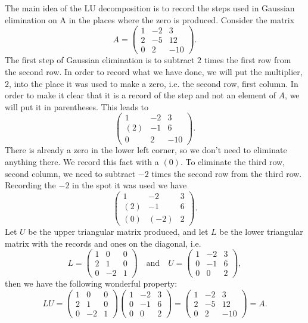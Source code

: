 The main idea of the LU decomposition
is to record the steps used in Gaussian elimination on A
in the places where the zero is produced.
Consider the matrix
$$
 A = \left(\begin{array}{ccc}
        1 & -2 & 3 \\
        2 & -5 & 12  \\
        0 & 2 & -10
      \end{array}\right).
$$
The first step of Gaussian elimination is to subtract $2$ times the
first row from the second row. In order to record what we have done,
we will put the multiplier, $2$, into the place it was used to make a
zero, i.e. the second row, first column. In order to make it clear
that it is a record of the step and not an element of $A$, we will put
it in parentheses. This leads to
$$
\left(\begin{array}{ccc}
        1 & -2 & 3 \\
        (2) & -1 & 6  \\
        0 & 2 & -10
      \end{array}\right).
$$
There is already a zero in the lower left corner, so we don't need to eliminate
anything there. We record this fact with a $(0)$. To eliminate the third row,
second column, we need to subtract
$-2$ times the second row from the third row. Recording the $-2$ in the spot
it was used we have
$$
\left(\begin{array}{ccc}
        1 & -2 & 3 \\
        (2) & -1 & 6  \\
        (0) & (-2) & 2
      \end{array}\right).
$$
Let $U$ be the upper triangular matrix produced, and let $L$ be the lower
triangular matrix with the records and ones on the diagonal, i.e.
$$
L = \left(\begin{array}{ccc}
        1 & 0 & 0 \\
        2 & 1 & 0  \\
        0 & -2 & 1
      \end{array}\right)
\quad\text{and}\quad
U = \left(\begin{array}{ccc}
         1 & -2 & 3 \\
         0 & -1 & 6  \\
         0 &  0 & 2
      \end{array}\right),
$$
then we have the following wonderful property:
$$
  LU = \left(\begin{array}{ccc}
        1 & 0 & 0 \\
        2 & 1 & 0  \\
        0 & -2 & 1
      \end{array}\right)
      \left(\begin{array}{ccc}
        1 & -2 & 3 \\
        0 & -1 & 6  \\
        0 & 0 & 2
      \end{array}\right)
=   \left(\begin{array}{ccc}
        1 & -2 & 3 \\
        2 & -5 & 12  \\
        0 & 2 & -10
      \end{array}\right)
= A.
$$
